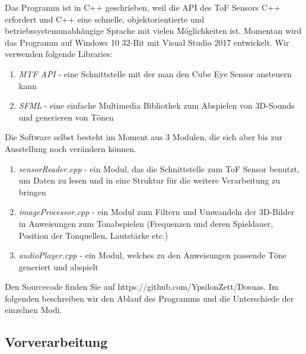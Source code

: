 \documentclass[a4paper,12pt,ngerman]{scrartcl}
\begin{document}
Das Programm ist in C++ geschrieben, weil die API des ToF Sensors C++ erfordert und C++ eine schnelle, objektorientierte und betriebssystemunabhängige Sprache mit vielen Möglichkeiten ist. Momentan wird das Programm
auf Windows 10 32-Bit mit Visual Studio 2017 entwickelt.
Wir verwenden folgende Libraries:
\begin{enumerate}
	\item \textit{MTF API} - eine Schnittstelle mit der man den Cube Eye Sensor ansteuern kann
	\item \textit{SFML} - eine einfache Multimedia Bibliothek zum Abspielen von 3D-Sounds und generieren von 
	Tönen
\end{enumerate} 
Die Software selbst besteht im Moment aus 3 Modulen, die sich aber bis zur Ausstellung noch verändern 
können.
\begin{enumerate}
	\item \textit{sensorReader.cpp} - ein Modul, das die Schnittstelle zum ToF Sensor benutzt, um Daten zu 
	lesen und in eine Struktur für die weitere Verarbeitung zu bringen
	\item \textit{imageProcessor.cpp} - ein Modul zum Filtern und Umwandeln der 3D-Bilder in Anweisungen zum 
	Tonabspielen (Frequenzen und deren Spieldauer, Position der Tonquellen, Lautstärke etc.)
	\item \textit{audioPlayer.cpp} - ein Modul, welches zu den Anweisungen passende Töne generiert und abspielt
\end{enumerate}
Den Sourcecode finden Sie auf https://github.com/YpsilonZett/Dosuas.
Im folgenden beschreiben wir den Ablauf des Programms und die Unterschiede der einzelnen Modi.

\subsection{Vorverarbeitung}
\end{document}
